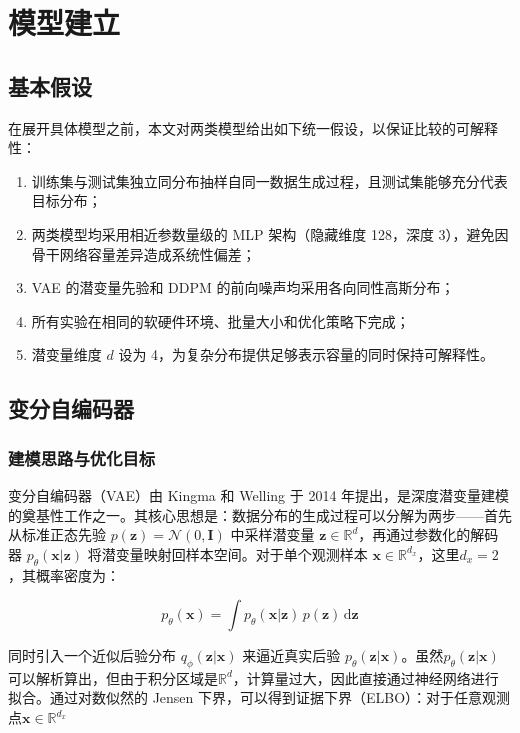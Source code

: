\documentclass[UTF8,a4paper,12pt]{ctexart}
\newcommand{\R}{\mathbb{R}}
\newcommand{\Ncal}{\mathcal{N}}
\begin{document}
\section{模型建立}

\subsection{基本假设}

在展开具体模型之前，本文对两类模型给出如下统一假设，以保证比较的可解释性：

\begin{enumerate}
    \item 训练集与测试集独立同分布抽样自同一数据生成过程，且测试集能够充分代表目标分布；
    \item 两类模型均采用相近参数量级的 MLP 架构（隐藏维度 128，深度 3），避免因骨干网络容量差异造成系统性偏差；
    \item VAE 的潜变量先验和 DDPM 的前向噪声均采用各向同性高斯分布；
    \item 所有实验在相同的软硬件环境、批量大小和优化策略下完成；
    \item 潜变量维度 $d$ 设为 4，为复杂分布提供足够表示容量的同时保持可解释性。
\end{enumerate}

\subsection{变分自编码器}

\subsubsection{建模思路与优化目标}

变分自编码器（VAE）由 Kingma 和 Welling 于 2014 年提出\cite{kingma2014vae}，是深度潜变量建模的奠基性工作之一。其核心思想是：数据分布的生成过程可以分解为两步——首先从标准正态先验 $p(\mathbf{z})=\Ncal(0,\mathbf{I})$ 中采样潜变量 $\mathbf{z}\in\R^d$，再通过参数化的解码器 $p_{\theta}(\mathbf{x}|\mathbf{z})$ 将潜变量映射回样本空间。对于单个观测样本 $\mathbf{x}\in\R^{d_x}$，这里$d_x = 2$，其概率密度为：

\begin{equation}
    p_{\theta}(\mathbf{x}) = \int p_{\theta}(\mathbf{x}|\mathbf{z})\,p(\mathbf{z})\,\mathrm{d}\mathbf{z}
\end{equation}

同时引入一个近似后验分布 $q_{\phi}(\mathbf{z}|\mathbf{x})$ 来逼近真实后验 $p_{\theta}(\mathbf{z}|\mathbf{x})$。虽然$p_\theta(\mathbf{z}|\mathbf{x})$可以解析算出，但由于积分区域是$\R^d$，计算量过大，因此直接通过神经网络进行拟合。通过对数似然的 Jensen 下界，可以得到证据下界（ELBO）\cite{lai2025principles}：对于任意观测点$\mathbf{x} \in \R^{d_x}$
\end{document}
